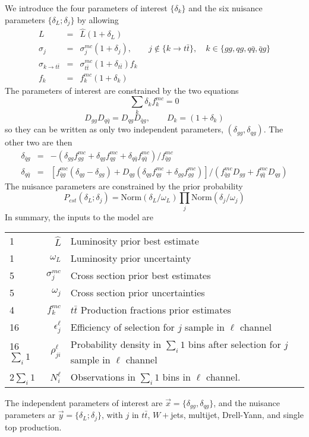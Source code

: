 \documentclass{article}
\begin{document}
We introduce the four parameters of interest $\{\delta_k\}$ and the
six nuisance parameters $\{\delta_L;\delta_j\}$ by allowing
\begin{eqnarray}
  L &=& \hat{L}(1+\delta_L) \\
  \sigma_j &=& \sigma_j^{mc}(1+\delta_j),\qquad j\notin \{k\to t\bar{t}\}, \quad k\in\{gg,qg,q\bar{q},\bar{q}g\}\\
  \sigma_{k\to t\bar{t}} &=& \sigma_{t\bar{t}}^{mc}(1+\delta_{t\bar{t}}) f_k\\
  f_k &=& f_k^{mc}(1+\delta_k)
\end{eqnarray}
The parameters of interest are constrained by the two equations
\begin{equation}
  \sum_k \delta_kf_k^{mc} = 0
\end{equation}
\begin{equation}
  D_{gg}D_{q\bar{q}} = D_{qg}D_{\bar{q}g}, \qquad D_k = (1+\delta_k)
\end{equation}
so they can be written as only two independent parameters,
$(\delta_{gg},\delta_{qg})$.  The other two are then
\begin{eqnarray}
  \delta_{\bar{q}g} &=& -\left(\delta_{gg}f_{gg}^{mc}+\delta_{qg}f_{qg}^{mc}+\delta_{q\bar{q}}f_{q\bar{q}}^{mc}\right)/f_{\bar{q}g}^{mc}\\
  \delta_{q\bar{q}} &=& \left[f_{\bar{q}g}^{mc}(\delta_{qg}-\delta_{gg}) + D_{qg}(\delta_{qg}f_{qg}^{mc}+\delta_{gg}f_{gg}^{mc})\right] / \left(f_{\bar{q}g}^{mc}D_{gg} + f_{q\bar{q}}^{mc}D_{qg}\right)
\end{eqnarray}
The nuisance parameters are constrained by the prior probability
\begin{equation}
  P_{cst}(\delta_L;\delta_j) = \mathrm{Norm}(\delta_L/\omega_L)\prod_j\mathrm{Norm}(\delta_j/\omega_j)
\end{equation}
In summary, the inputs to the model are
\begin{center}
  \begin{tabular}{lrl}
    1&$\hat{L}$ & Luminosity prior best estimate \\
    1&$\omega_L$ & Luminosity prior uncertainty\\
    5&$\sigma_j^{mc}$ & Cross section prior best estimates\\
    5&$\omega_j$ & Cross section prior uncertainties\\
    4&$f^{mc}_k$ & $t\bar{t}$ Production fractions prior estimates\\
    16&$\epsilon_j^\ell$ & Efficiency of selection for $j$ sample in $\ell$ channel\\
    16$\sum_i1$&$\rho_{ji}^\ell$ & Probability density in $\sum_i1$ bins after selection for $j$ sample in $\ell$ channel\\
    2$\sum_i1$&$N_i^\ell$ & Observations in $\sum_i1$ bins in $\ell$ channel.
  \end{tabular}
\end{center}
The independent parameters of interest are $\vec{x} =
\{\delta_{gg},\delta_{qg}\}$, and the nuisance parameters ar $\vec{y}
= \{\delta_L;\delta_j\}$, with $j$ in $t\bar{t}$, $W+$jets, multijet,
Drell-Yann, and single top production.
\end{document}
